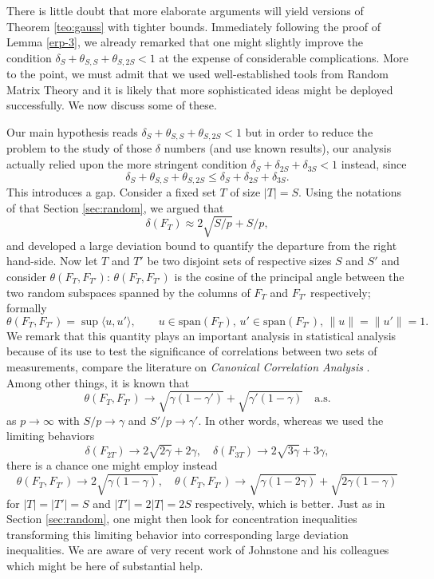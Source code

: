 \documentclass[11pt]{article}
\newcommand{\<}{\langle}
\renewcommand{\>}{\rangle}
\newcommand{\goto}{\rightarrow}
\numberwithin{equation}{section}
\begin{document}
There is little doubt that more elaborate arguments will yield
versions of Theorem \ref{teo:gauss} with tighter bounds.  Immediately
following the proof of Lemma \ref{erp-3}, we already remarked that one
might slightly improve the condition $\delta_S + \theta_{S,S} +
\theta_{S,2S} < 1$ at the expense of considerable complications. More
to the point, we must admit that we used well-established tools from
Random Matrix Theory and it is likely that more sophisticated ideas
might be deployed successfully. We now discuss some of these.

Our main hypothesis reads $\delta_S + \theta_{S,S} + \theta_{S,2S} <
1$ but in order to reduce the problem to the study of those
$\delta$ numbers (and use known results), our analysis actually relied
upon the more stringent condition $\delta_S + \delta_{2S} +
\delta_{3S} < 1$ instead, since
\[
\delta_S + \theta_{S,S} + \theta_{S,2S} \le \delta_S + \delta_{2S} +
\delta_{3S}. 
\]
This introduces a gap. Consider a fixed set $T$ of size
$|T| = S$. Using the notations of
that Section \ref{sec:random}, we argued that 
\[
\delta(F_T) \approx 2\sqrt{S/p} + S/p, 
\] 
and developed a large deviation bound to quantify the departure from
the right hand-side. Now let $T$ and $T'$ be two disjoint sets of
respective sizes $S$ and $S'$ and consider $\theta(F_T, F_{T'})$:
$\theta(F_T, F_{T'})$ is the cosine of the principal angle between the
two random subspaces spanned by the columns of $F_T$ and $F_{T'}$
respectively; formally
\[ 
\theta(F_T, F_{T'}) = \sup \<u, u'\>, 
\qquad u \in \text{span}(F_T), \, u' \in \text{span}(F_{T'}), \, 
\|u\| = \|u'\| = 1.
\] 
We remark that this quantity plays an important analysis in
statistical analysis because of its use to test the significance of
correlations between two sets of measurements, compare the literature
on {\em Canonical Correlation Analysis} \cite{Muirhead}. Among other
things, it is known \cite{Wachter} that 
\[
\theta(F_T, F_{T'}) \goto \sqrt{\gamma(1-\gamma')} + \sqrt{\gamma'(1-\gamma)} 
\quad \text{a.s.} 
\] 
as $p \goto \infty$ with $S/p \goto \gamma$ and $S'/p \goto \gamma'$.
In other words, whereas we used the limiting behaviors
\[
\delta(F_{2T}) \goto 2\sqrt{2\gamma} + 2\gamma, \quad \delta(F_{3T}) \goto  
2\sqrt{3\gamma} + 3\gamma,
\]
there is a chance one might employ instead 
\[ 
\theta(F_T, F_{T'}) \goto 2\sqrt{\gamma(1-\gamma)}, \quad \theta(F_T, F_{T'})
\goto \sqrt{\gamma(1-2\gamma)} + \sqrt{2\gamma(1-\gamma)}
\] 
for $|T| = |T'| = S$ and $|T'| = 2|T| = 2S$ respectively, which is
better. Just as in Section \ref{sec:random}, one might then look for
concentration inequalities transforming this limiting behavior into
corresponding large deviation inequalities.  We are aware of very
recent work of Johnstone and his colleagues \cite{IainWaldWeb} which
might be here of substantial help.
\end{document}
